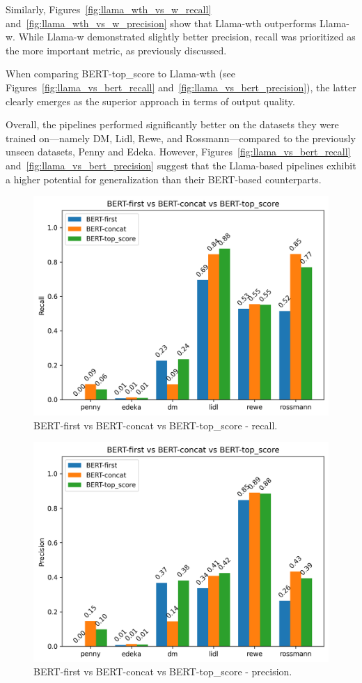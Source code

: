 \documentclass[licencjacka,en]{pracamgr}
\begin{document}
Similarly, Figures~\ref{fig:llama_wth_vs_w_recall} and~\ref{fig:llama_wth_vs_w_precision} show that Llama-wth outperforms Llama-w. While Llama-w demonstrated slightly better precision, recall was prioritized as the more important metric, as previously discussed.

When comparing BERT-top\_score to Llama-wth (see Figures~\ref{fig:llama_vs_bert_recall} and~\ref{fig:llama_vs_bert_precision}), the latter clearly emerges as the superior approach in terms of output quality.

Overall, the pipelines performed significantly better on the datasets they were trained on—namely DM, Lidl, Rewe, and Rossmann—compared to the previously unseen datasets, Penny and Edeka. However, Figures~\ref{fig:llama_vs_bert_recall} and~\ref{fig:llama_vs_bert_precision} suggest that the Llama-based pipelines exhibit a higher potential for generalization than their BERT-based counterparts.

\begin{figure}[htbp]
    \centering
    \includegraphics[width=0.8\linewidth]{bachelor_images/benchmark/berts_recall.png}
    \caption{BERT-first vs BERT-concat vs BERT-top\_score - recall.}
    \label{fig:berts_recall}
\end{figure}

\begin{figure}[htbp]
    \centering
    \includegraphics[width=0.8\linewidth]{bachelor_images/benchmark/berts_precision.png}
    \caption{BERT-first vs BERT-concat vs BERT-top\_score - precision.}
    \label{fig:berts_precision}
\end{figure}
\end{document}
